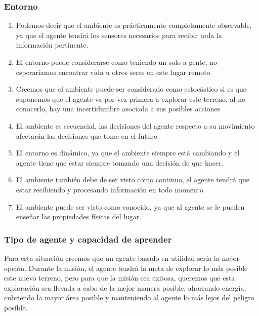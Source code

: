 \documentclass{article}
\begin{document}
            \subsubsection{Entorno}
                \begin{enumerate}
                    \item Podemos decir que el ambiente es prácticamente completamente  observable, ya que el agente tendrá los sensores necesarios para recibir toda la información pertinente.
                    \item El entorno puede considerarse como teniendo un solo a gente, no esperaríamos encontrar vida u otros seres en este lugar remoto
                    \item Creemos que el ambiente puede ser considerado como estocástico si es que suponemos que el agente va por vez primera a explorar este terreno, al no conocerlo, hay una incertidumbre asociada a sus posibles acciones
                    \item El ambiente es secuencial, las decisiones del agente respecto a su movimiento afectarán las decisiones que tome en el futuro
                    \item El entorno es dinámico, ya que el ambiente siempre está cambiando y el agente tiene que estar siempre tomando una decisión de que hacer. 
                    \item El ambiente también debe de ser visto como continuo, el agente tendrá que estar recibiendo y procesando información en todo momento
                    \item El ambiente puede ser visto como conocido, ya que al agente se le pueden enseñar las propiedades físicas del lugar.
                \end{enumerate}

            \subsubsection{Tipo de agente y capacidad de aprender}
                Para esta situación creemos que un agente basado en utilidad sería la mejor opción. Durante la misión, el agente tendrá la meta de explorar lo más posible este nuevo terreno, pero para que la misión sea exitosa, queremos que esta exploración sea llevada a cabo de la mejor manera posible, ahorrando energía, cubriendo la mayor área posible y manteniendo al agente lo más lejos del peligro posible.
\end{document}

